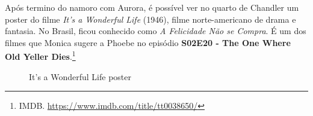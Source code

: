 \saveparinfos
\noindent
\begin{minipage}[c]{0.5\textwidth}\useparinfo

Após termino do namoro com Aurora, é possível ver no quarto de Chandler
um poster do filme \emph{It's a Wonderful Life} (1946), filme
norte-americano de drama e fantasia. No Brasil, ficou conhecido como
\emph{A Felicidade Não se Compra}. É um dos filmes que Monica sugere a
Phoebe no episódio
\textbf{\textcolor{primarycolor}{S02E20 - The One Where Old Yeller Dies}}.\footnote{\sloppy IMDB. \url{https://www.imdb.com/title/tt0038650/}}

\end{minipage}\hfill
\begin{minipage}[c]{0.5\textwidth}

\begin{figure}
  \centering
    \caption{It’s a Wonderful Life poster\label{fig:it-s-a-wonderful-life-poster}}
\end{figure}

\end{minipage}
